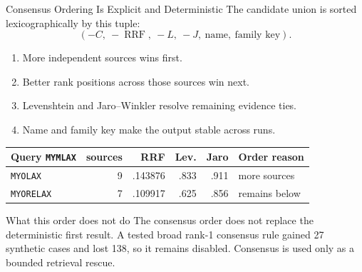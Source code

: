 \documentclass[aspectratio=169,10pt]{beamer}
\newcommand{\code}[1]{\texttt{#1}}
\begin{document}
\begin{frame}{Consensus Ordering Is Explicit and Deterministic}
\small
The candidate union is sorted lexicographically by this tuple:
\[
\left(
-C,\ -\operatorname{RRF},\ -L,\ -J,\ \text{name},\ \text{family key}
\right).
\]

\begin{enumerate}
  \item More independent sources wins first.
  \item Better rank positions across those sources win next.
  \item Levenshtein and Jaro--Winkler resolve remaining evidence ties.
  \item Name and family key make the output stable across runs.
\end{enumerate}

\begin{table}
\centering
\scriptsize
\begin{tabular}{@{}lrrrrl@{}}
\toprule
\textbf{Query \code{MYMLAX}} & \textbf{sources} & \textbf{RRF} & \textbf{Lev.} & \textbf{Jaro} & \textbf{Order reason} \\
\midrule
\code{MYOLAX} & 9 & .143876 & .833 & .911 & more sources \\
\code{MYORELAX} & 7 & .109917 & .625 & .856 & remains below \\
\bottomrule
\end{tabular}
\end{table}

\begin{alertblock}{What this order does not do}
The consensus order does not replace the deterministic first result. A tested broad
rank-1 consensus rule gained 27 synthetic cases and lost 138, so it remains
disabled. Consensus is used only as a bounded retrieval rescue.
\end{alertblock}
\end{frame}
\end{document}
